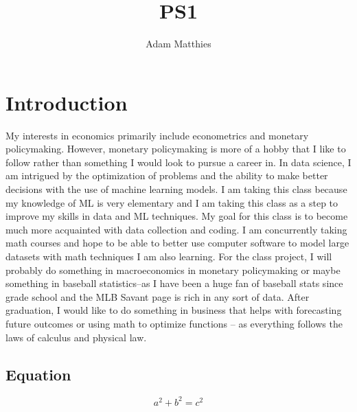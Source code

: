 \documentclass{article}
\title{PS1}
\author{Adam Matthies}
\begin{document}
\maketitle

\section{Introduction}

My interests in economics primarily include econometrics and monetary policymaking. However, monetary policymaking is more of a hobby that I like to follow rather than something I would look to pursue a career in. In data science, I am intrigued by the optimization of problems and the ability to make better decisions with the use of machine learning models. I am taking this class because my knowledge of ML is very elementary and I am taking this class as a step to improve my skills in data and ML techniques. My goal for this class is to become much more acquainted with data collection and coding. I am concurrently taking math courses and hope to be able to better use computer software to model large datasets with math techniques I am also learning. For the class project, I will probably do something in macroeconomics in monetary policymaking or maybe something in baseball statistics--as I have been a huge fan of baseball stats since grade school and the MLB Savant page is rich in any sort of data. After graduation, I would like to do something in business that helps with forecasting future outcomes or using math to optimize functions -- as everything follows the laws of calculus and physical law.

\subsection{Equation}

\[ a^2 + b^2 = c^2 \]
\end{document}
